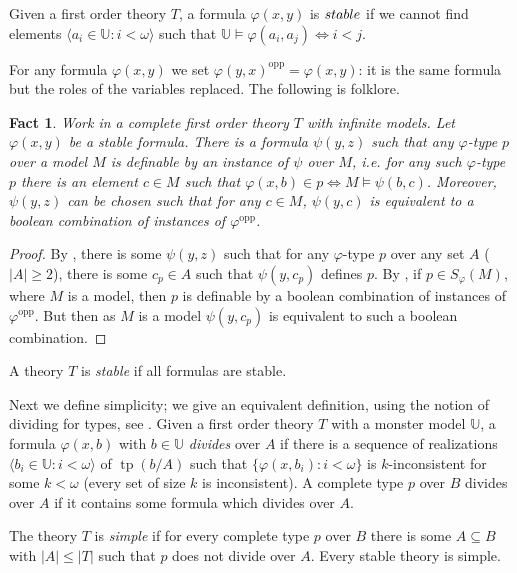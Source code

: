 \documentclass[a4paper]{amsart}
\theoremstyle{plain}
\newtheorem{fact}[theorem]{Fact}
\theoremstyle{definition}
\theoremstyle{remark}
\numberwithin{equation}{section}
\DeclareMathOperator{\tp}{tp}
\begin{document}
Given a first order theory $T$, a formula $\varphi(x,y)$ is $\emph{stable}$ if we cannot find elements $\langle a_i\in \mathbb{U}: i<\omega\rangle$ such that $\mathbb{U}\models \varphi(a_i,a_j)\iff i<j$. 

For any formula $\varphi(x,y)$ we set $\varphi(y,x)^{\text{opp}}=\varphi(x,y)$: it is the same formula but the roles of the variables replaced. The following is folklore.
\begin{fact}\label{F:def of types}
Work in a complete first order theory $T$ with infinite models. Let $\varphi(x,y)$ be a stable formula. There is a formula $\psi(y,z)$ such that  any $\varphi$-type $p$ over a model $M$ is definable by an instance of $\psi$ over $M$, i.e. for any such $\varphi$-type $p$ there is an element $c\in M$ such that $\varphi(x,b)\in p\iff M\vDash  \psi(b,c)$. Moreover, $\psi(y,z)$ can be chosen such that for any $c\in M$, $\psi(y,c)$ is equivalent to a boolean combination of instances of $\varphi^{\text{opp}}$. 
\end{fact}
\begin{proof}
By \cite[Theorem II.2.12]{classification}, there is some $\psi(y,z)$ such that for any $\varphi$-type $p$ over any set $A$ ($|A|\geq 2$), there is some $c_p\in A$ such that $\psi(y,c_p)$ defines $p$. By \cite[Lemma 2.2(i)]{Pillay}, if $p\in S_{\varphi}(M)$, where $M$ is a model, then $p$ is definable by a boolean combination of instances of $\varphi^{\text{opp}}$. But then as $M$ is a model $\psi(y,c_p)$ is equivalent to such a boolean combination.
\end{proof}

A theory $T$ is \emph{stable} if all formulas are stable.

Next we define simplicity; we give an equivalent definition, using the notion of dividing for types, see \cite[Proposition 7.2.5]{TZ}. Given a first order theory $T$ with a monster model $\mathbb{U}$, a formula $\varphi(x,b)$ with $b\in \mathbb{U}$ \emph{divides} over $A$ if there is a sequence of realizations $\langle b_i\in \mathbb{U}:i<\omega\rangle$ of $\tp(b/A)$ such that $\{\varphi(x,b_i):i<\omega\}$ is $k$-inconsistent for some $k<\omega$ (every set of size $k$ is inconsistent). A complete type $p$ over $B$ divides over $A$ if it contains some formula which divides over $A$.

The theory $T$ is \emph{simple} if for every complete type $p$ over $B$ there is some $A\subseteq B$ with $|A|\leq |T|$ such that $p$ does not divide over $A$. Every stable theory is simple.
\end{document}
